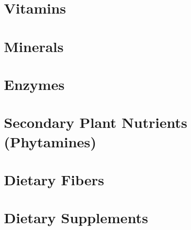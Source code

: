 \documentclass[../main.tex]{subfiles}
\begin{document}

\section{Vitamins}


\section{Minerals}


 
\section{Enzymes}



\section{Secondary Plant Nutrients (Phytamines)}



\section{Dietary Fibers}



\section{Dietary Supplements}


\end{document}
